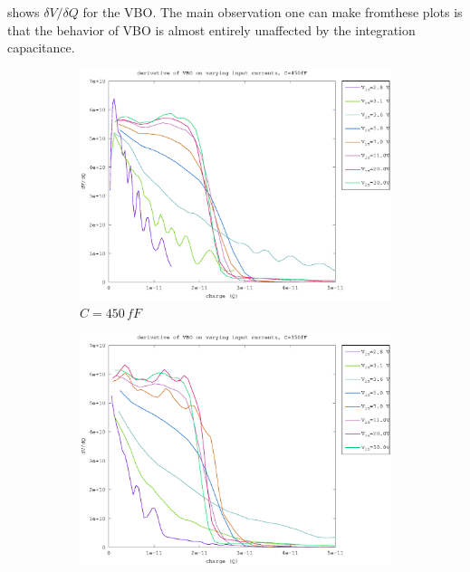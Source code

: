  shows $\delta V/\delta Q$ for the VBO. The main observation one can make fromthese plots is that the behavior of VBO is almost entirely unaffected by the integration capacitance.


\begin{figure}[h]
	\centering
	\begin{subfigure}[b]{0.475\textwidth}
	    \centering
	    \includegraphics[width=\textwidth]{fig/vbo_d_slope_450fF.eps}
	    \caption[Network2]%
	    {$C=450\,fF$}    
	    \label{fig:vbo_d_slopes_450fF}
	\end{subfigure}
	\hfill
	\begin{subfigure}[b]{0.475\textwidth}  
	    \centering 
	    \includegraphics[width=\textwidth]{fig/vbo_d_slope_350fF.eps}

\end{subfigure}
\end{figure}

